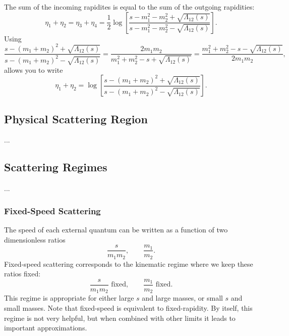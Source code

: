 The sum of the incoming rapidites is equal to the sum of the outgoing rapidities:
\begin{equation}
	\eta_{1} + \eta_{2} = \eta_{3} + \eta_{4} = \frac{1}{2} \log{\left[ \frac{s - m_{1}^{2} - m_{2}^{2} + \sqrt{\Lambda_{12}(s)}}{s - m_{1}^{2} - m_{2}^{2} - \sqrt{\Lambda_{12}(s)}} \right]}.
\end{equation}
Using
\begin{equation}
	\frac{s - (m_{1} + m_{2})^{2} + \sqrt{\Lambda_{12}(s)}}{s - (m_{1} + m_{2})^{2} - \sqrt{\Lambda_{12}(s)}} = \frac{2 m_{1} m_{2}}{m_{1}^{2} + m_{2}^{2} - s + \sqrt{\Lambda_{12}(s)}} = \frac{m_{1}^{2} + m_{2}^{2} - s - \sqrt{\Lambda_{12}(s)}}{2 m_{1} m_{2}},
\end{equation}
allows you to write
\begin{equation}
	\eta_{1} + \eta_{2} = \log{\left[ \frac{s - (m_{1} + m_{2})^{2} + \sqrt{\Lambda_{12}(s)}}{s - (m_{1} + m_{2})^{2} - \sqrt{\Lambda_{12}(s)}} \right]}.
\end{equation}
\subsection{Physical Scattering Region}
...
\subsection{Scattering Regimes}
...
\subsubsection{Fixed-Speed Scattering}
The speed of each external quantum can be written as a function of two dimensionless ratios
\begin{equation}
	\frac{s}{m_{1} m_{2}}, \qquad \frac{m_{1}}{m_{2}}.
\end{equation}
Fixed-speed scattering corresponds to the kinematic regime where we keep these ratios fixed:
\begin{equation}
	\frac{s}{m_{1} m_{2}} \text{ fixed}, \qquad \frac{m_{1}}{m_{2}} \text{ fixed}.
\end{equation}
This regime is appropriate for either large $s$ and large masses, or small $s$ and small masses. Note that fixed-speed is equivalent to fixed-rapidity. By itself, this regime is not very helpful, but when combined with other limits it leads to important approximations.
